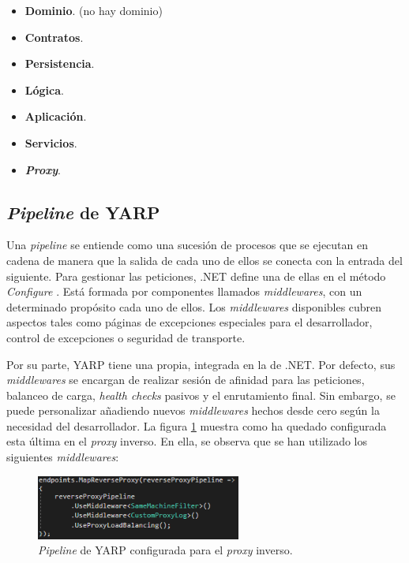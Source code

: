 \documentclass[11pt,spanish,listoffigures]{tfgetsinf}
\begin{document}
\begin{itemize}

	\item \textbf{Dominio}. (no hay dominio)

	\item \textbf{Contratos}.

	\item \textbf{Persistencia}.

	\item \textbf{Lógica}.

	\item \textbf{Aplicación}.

	\item \textbf{Servicios}.

	\item \textbf{\emph{Proxy}}.

\end{itemize}


		\subsection{\emph{Pipeline} de YARP} \label{pipelineYARP}

Una \emph{pipeline} se entiende como una sucesión de procesos que se ejecutan en cadena de manera que la salida de cada uno de ellos se conecta con la entrada del siguiente. Para gestionar las peticiones, .NET define una de ellas en el método \emph{Configure} \cite{MiddlewaresPipeline}. Está formada por componentes llamados \emph{middlewares}, con un determinado propósito cada uno de ellos. Los \emph{middlewares} disponibles cubren aspectos tales como páginas de excepciones especiales para el desarrollador, control de excepciones o seguridad de transporte.

Por su parte, YARP tiene una propia, integrada en la de .NET. Por defecto, sus \emph{middlewares} se encargan de realizar sesión de afinidad para las peticiones, balanceo de carga, \emph{health checks} pasivos y el enrutamiento final. Sin embargo, se puede personalizar añadiendo nuevos \emph{middlewares} hechos desde cero según la necesidad del desarrollador. La figura \ref{pipelineYARP_imagen} muestra como ha quedado configurada esta última en el \emph{proxy} inverso. En ella, se observa que se han utilizado los siguientes \emph{middlewares}:

\begin{figure}[ht]
\centering
\includegraphics[width=0.6\textwidth]{imagenes/pipelineYARP}
\caption{\emph{Pipeline} de YARP configurada para el \emph{proxy} inverso.}
	\label{pipelineYARP_imagen}
\end{figure}
\end{document}
